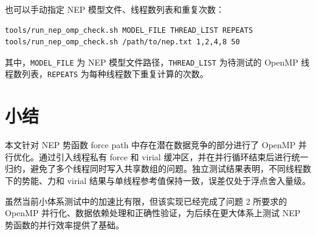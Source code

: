 \documentclass[11pt]{article}
\begin{document}
也可以手动指定 NEP 模型文件、线程数列表和重复次数：

\begin{lstlisting}[language=bash]
tools/run_nep_omp_check.sh MODEL_FILE THREAD_LIST REPEATS
tools/run_nep_omp_check.sh /path/to/nep.txt 1,2,4,8 50
\end{lstlisting}

其中，\texttt{MODEL\_FILE} 为 NEP 模型文件路径，\texttt{THREAD\_LIST} 为待测试的 OpenMP 线程数列表，\texttt{REPEATS} 为每种线程数下重复计算的次数。

\section{小结}

本文针对 NEP 势函数 force path 中存在潜在数据竞争的部分进行了 OpenMP 并行优化。通过引入线程私有 force 和 virial 缓冲区，并在并行循环结束后进行统一归约，避免了多个线程同时写入共享数组的问题。独立测试结果表明，不同线程数下的势能、力和 virial 结果与单线程参考值保持一致，误差仅处于浮点舍入量级。

虽然当前小体系测试中的加速比有限，但该实现已经完成了问题 2 所要求的 OpenMP 并行化、数据依赖处理和正确性验证，为后续在更大体系上测试 NEP 势函数的并行效率提供了基础。
\end{document}
